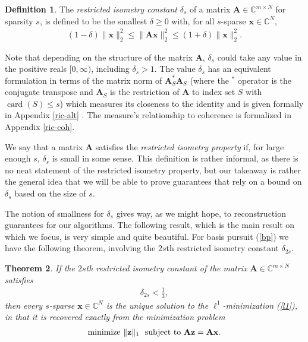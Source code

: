 \documentclass[12pt,a4paper]{amsart}
\numberwithin{equation}{section}
\theoremstyle{plain}
\newtheorem{Th}{Theorem}[section]
\theoremstyle{definition}
\newtheorem{Def}[Th]{Definition}
\newcommand{\BC}{\mathbb C}
\newcommand{\bdx}{\mathbf{x}}
\newcommand{\bdz}{\mathbf{z}}
\newcommand{\bdA}{\mathbf{A}}
\DeclareMathOperator{\card}{card}
\begin{document}
\begin{Def}\label{ric} The \textit{restricted isometry constant} $\delta_s$ of a matrix $\bdA\in\BC^{m\times N}$ for sparsity $s$, is defined to be the smallest $\delta\geq0$ with, for all $s$-sparse $\bdx\in\BC^N$,
\begin{align}\label{ric-def}
    (1-\delta)\|\bdx\|_2^2\leq\|\bdA\bdx\|_2^2\leq(1+\delta)\|\bdx\|_2^2.
\end{align}
\end{Def}

Note that depending on the structure of the matrix $\bdA$, $\delta_s$ could take any value in the positive reals $[0,\infty)$, including $\delta_s>1$. The value $\delta_s$ has an equivalent formulation in terms of the matrix norm of $\bdA_S^*\bdA_S$ (where the $^*$ operator is the conjugate transpose and $\bdA_S$ is the restriction of $\bdA$ to index set $S$ with $\card(S)\leq s$) which measures its closeness to the identity and is given formally in Appendix \ref{ric-alt} \cite{fou-rau}. The measure's relationship to coherence is formalized in Appendix \ref{ric-coh}. 

We say that a matrix $\bdA$ satisfies the \textit{restricted isometry property} if, for large enough $s$, $\delta_s$ is small in some sense. This definition is rather informal, as there is no neat statement of the restricted isometry property, but our takeaway is rather the general idea that we will be able to prove guarantees that rely on a bound on $\delta_s$ based on the size of $s$.

The notion of smallness for $\delta_s$ gives way, as we might hope, to reconstruction guarantees for our algorithms. The following result, which is the main result on which we focus, is very simple and quite beautiful. For basis pursuit (\ref{bp}) we have the following theorem, involving the $2s$th restricted isometry constant $\delta_{2s}$.

\begin{Th}\label{ric-bp} If the $2s$th restricted isometry constant of the matrix $\bdA\in\BC^{m\times N}$ satisfies
\begin{align}
    \delta_{2s}<\frac{1}{3},
\end{align}
then every $s$-sparse $\bdx\in\BC^N$ is the unique solution to the $\ell^1$-minimization (\ref{l1}), in that it is recovered exactly from the minimization problem
\begin{align*}
    \textnormal{minimize }\|\bdz\|_1 \ \ \textnormal{subject to }\bdA\bdz=\bdA\bdx.
\end{align*}
\end{Th}
\end{document}
